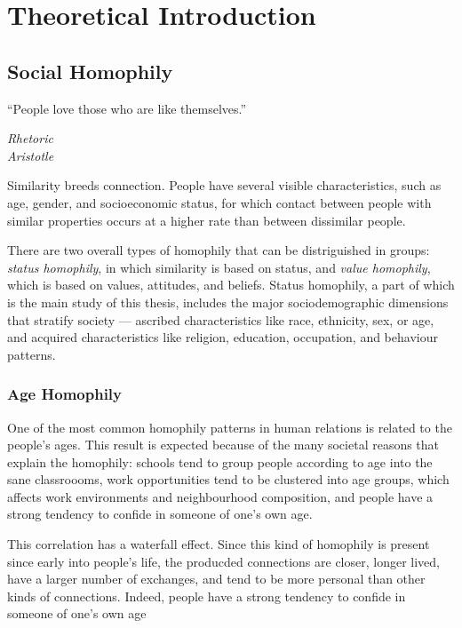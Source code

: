 \chapter{Theoretical Introduction}

\section{Social Homophily}

\epigraph{``People love those who are like themselves.''}{\textit{Rhetoric \\ Aristotle}}

Similarity breeds connection\cite{mcpherson2001birds}. People have several visible characteristics, such as age, gender, and socioeconomic status, for which contact between people with similar properties occurs at a higher rate than between dissimilar people.

There are two overall types of homophily that can be distriguished in groups\cite{lazarsfeld1954}: \textit{status homophily}, in which similarity is based on status, and \textit{value homophily}, which is based on values, attitudes, and beliefs. Status homophily, a part of which is the main study of this thesis, includes the major sociodemographic dimensions that stratify society --- ascribed characteristics like race, ethnicity, sex, or age, and acquired characteristics like religion, education, occupation, and behaviour patterns.

\subsection{Age Homophily}

One of the most common homophily patterns in human relations is related to the people's ages\cite{ugander2011}\cite{mcpherson2001birds}. This result is expected because of the many societal reasons that explain the homophily: schools tend to group people according to age into the sane classroooms, work opportunities tend to be clustered into age groups, which affects work environments and neighbourhood composition, and people have a strong tendency to confide in someone of one's own age.

This correlation has a waterfall effect. Since this kind of homophily is present since early into people's life, the producded connections are closer, longer lived, have a larger number of exchanges, and tend to be more personal than other kinds of connections. Indeed, people have a strong tendency to confide in someone of one's own age\cite{mcpherson2001birds}

